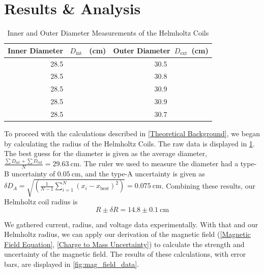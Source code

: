 \documentclass[prX,nofootinbib,notitlepage]{revtex4-1}
\begin{document}

\section{Results \& Analysis}

\begin{table}[h]
\begin{tabular}{|c|c|}
\hline
\textbf{Inner Diameter}~ $D_\text{int}$ ~\textbf{(cm)} & \textbf{Outer Diameter}~$D_\text{ext}$~\textbf{(cm)} \\\hline
28.5 & 30.5 \\\hline
28.5 & 30.8 \\\hline
28.5 & 30.9 \\\hline
28.5 & 30.9 \\\hline
28.5 & 30.7 \\\hline
\end{tabular}
\caption{Inner and Outer Diameter Measurements of the Helmholtz Coils}
\label{table:DiameterTable}
\end{table}

To proceed with the calculations described in \ref{Theoretical Background}, we began by calculating the radius of the Helmholtz Coils. The raw data is displayed in \ref{table:DiameterTable}. The best guess for the diameter is given as the average diameter, $\frac{\sum D_\text{int} + \sum D_\text{ext}}{N} = 29.63~\text{cm}$. The ruler we used to measure the diameter had a type-B uncertainty of $0.05~\text{cm}$, and the type-A uncertainty is given as $\delta D_{A} = \sqrt{\left(\frac{1}{N-1} \sum\limits_{i=1}^{N} (x_{i} - x_{\text{best}})^{2}\right)} = 0.075 ~\text{cm}$. Combining these results, our Helmholtz coil radius is
$$
R \pm \delta R = 14.8 \pm 0.1 ~\text{cm}
$$

We gathered current, radius, and voltage data experimentally. With that and our Helmholtz radius, we can apply our derivation of the magnetic field (\ref{Magnetic Field Equation}, \ref{Charge to Mass Uncertainty}) to calculate the strength and uncertainty of the magnetic field. The results of these calculations, with error bars, are displayed in \ref{fig:mag_field_data}. 
\end{document}
